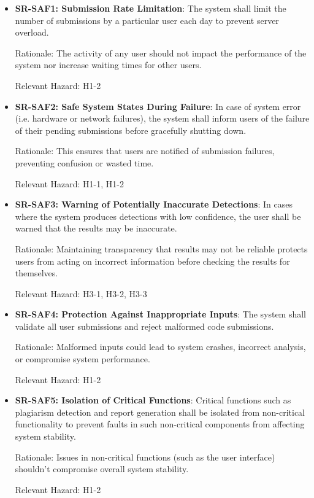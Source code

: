 \documentclass{article}
\begin{document}
\begin{itemize}
\item \label{req:saf1} \textbf{SR-SAF1: Submission Rate Limitation}: The system shall limit the number of submissions by a particular user each day to prevent server overload.

Rationale: The activity of any user should not impact the performance of the system nor increase waiting times for other users.

Relevant Hazard: H1-2

\item \label{req:saf2} \textbf{SR-SAF2: Safe System States During Failure}: In case of system error (i.e. hardware or network failures), the system shall inform users of the failure of their pending submissions before gracefully shutting down.

Rationale: This ensures that users are notified of submission failures, preventing confusion or wasted time.

Relevant Hazard: H1-1, H1-2

\item \label{req:saf3} \textbf{SR-SAF3: Warning of Potentially Inaccurate Detections}: In cases where the system produces detections with low confidence, the user shall be warned that the results may be inaccurate.

Rationale: Maintaining transparency that results may not be reliable protects users from acting on incorrect information before checking the results for themselves.

Relevant Hazard: H3-1, H3-2, H3-3

\item \label{req:saf4} \textbf{SR-SAF4: Protection Against Inappropriate Inputs}: The system shall validate all user submissions and reject malformed code submissions.

Rationale: Malformed inputs could lead to system crashes, incorrect analysis, or compromise system performance.

Relevant Hazard: H1-2

\item \label{req:saf5} \textbf{SR-SAF5: Isolation of Critical Functions}: Critical functions such as plagiarism detection and report generation shall be isolated from non-critical functionality to prevent faults in such non-critical components from affecting system stability.

Rationale: Issues in non-critical functions (such as the user interface) shouldn't compromise overall system stability.

Relevant Hazard: H1-2

\end{itemize}
\end{document}
